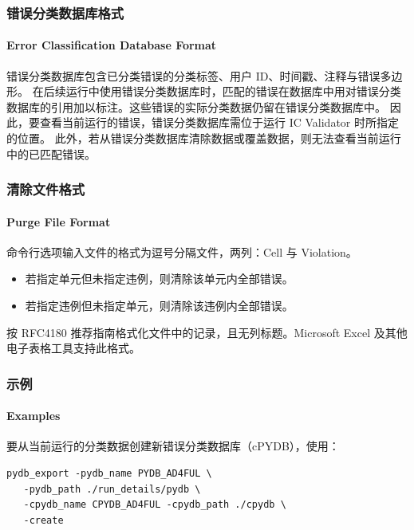 \subsubsection{错误分类数据库格式}
\paragraph*{Error Classification Database Format}

错误分类数据库包含已分类错误的分类标签、用户 ID、时间戳、注释与错误多边形。
在后续运行中使用错误分类数据库时，匹配的错误在数据库中用对错误分类数据库的引用加以标注。这些错误的实际分类数据仍留在错误分类数据库中。
因此，要查看当前运行的错误，错误分类数据库需位于运行 IC Validator 时所指定的位置。
此外，若从错误分类数据库清除数据或覆盖数据，则无法查看当前运行中的已匹配错误。

\subsubsection{清除文件格式}
\paragraph*{Purge File Format}

 命令行选项输入文件的格式为逗号分隔文件，两列：Cell 与 Violation。
\begin{itemize}
  \item 若指定单元但未指定违例，则清除该单元内全部错误。
  \item 若指定违例但未指定单元，则清除该违例内全部错误。
\end{itemize}

按 RFC4180 推荐指南格式化文件中的记录，且无列标题。Microsoft Excel 及其他电子表格工具支持此格式。

\subsubsection{示例}
\paragraph*{Examples}

要从当前运行的分类数据创建新错误分类数据库（cPYDB），使用：
\begin{lstlisting}[style=shell]
pydb_export -pydb_name PYDB_AD4FUL \
   -pydb_path ./run_details/pydb \
   -cpydb_name CPYDB_AD4FUL -cpydb_path ./cpydb \
   -create
\end{lstlisting}

